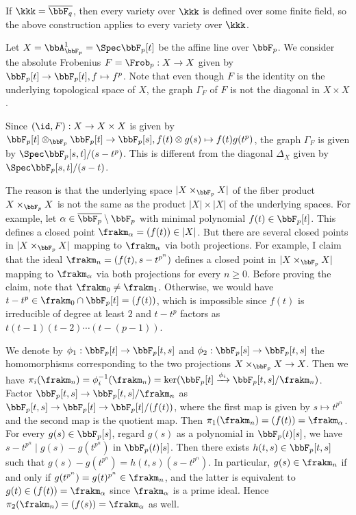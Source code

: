   If $\kkk = \overline{\bbF_q}$, then every variety over $\kkk$ is defined over some finite field, so the above construction applies to every variety over $\kkk$.

  \begin{example}
    Let $X = \bbA^1_{\bbF_p} = \Spec \bbF_p[t]$ be the affine line over $\bbF_p$.
    We consider the absolute Frobenius $F = \Frob_p: X \to X$ given by $\bbF_p[t] \to \bbF_p[t], f \mapsto f^p$.
    Note that even though $F$ is the identity on the underlying topological space of $X$, the graph $\Gamma_F$ of $F$ is not the diagonal in $X \times X$.
    
    Since $(\id,F): X \to X \times X$ is given by $\bbF_p[t] \otimes_{\bbF_p} \bbF_p[t] \to \bbF_p[s], f(t) \otimes g(s) \mapsto f(t) g(t^p)$, the graph $\Gamma_F$ is given by $\Spec \bbF_p[s,t]/(s - t^p)$.
    This is different from the diagonal $\Delta_X$ given by $\Spec \bbF_p[s,t]/(s-t)$.
     
    The reason is that the underlying space $|X \times_{\bbF_p} X|$ of the fiber product $X \times_{\bbF_p} X$ is not the same as the product $|X| \times |X|$ of the underlying spaces.
    For example, let $\alpha \in \overline{\bbF_p} \setminus \bbF_p$ with minimal polynomial $f(t) \in \bbF_p[t]$.
    This defines a closed point $\frakm_\alpha = (f(t)) \in |X|$.
    But there are several closed points in $|X \times_{\bbF_p} X|$ mapping to $\frakm_\alpha$ via both projections.
    For example, I claim that the ideal $\frakm_n = (f(t), s-t^{p^n})$ defines a closed point in $|X \times_{\bbF_p} X|$ mapping to $\frakm_\alpha$ via both projections for every $n \geq 0$.
    Before proving the claim, note that $\frakm_0 \neq \frakm_1$.
    Otherwise, we would have $t-t^p \in \frakm_0 \cap \bbF_p[t] = (f(t))$, which is impossible since $f(t)$ is irreducible of degree at least $2$ and $t-t^p$ factors as $t(t-1)(t-2) \cdots (t-(p-1))$.

    We denote by $\phi_1: \bbF_p[t] \to \bbF_p[t,s]$ and $\phi_2: \bbF_p[s] \to \bbF_p[t,s]$ the homomorphisms corresponding to the two projections $X \times_{\bbF_p} X \to X$.
    Then we have $\pi_i(\frakm_n) = \phi_i^{-1}(\frakm_n) = \ker(\bbF_p[t] \xrightarrow{\phi_i} \bbF_p[t,s]/\frakm_n)$.
    Factor $\bbF_p[t,s] \to \bbF_p[t,s]/\frakm_n$ as $\bbF_p[t,s] \to \bbF_p[t] \to \bbF_p[t]/(f(t))$, where the first map is given by $s \mapsto t^{p^n}$ and the second map is the quotient map.
    Then $\pi_1(\frakm_n) = (f(t)) = \frakm_\alpha$.
    For every $g(s) \in \bbF_p[s]$, regard $g(s)$ as a polynomial in $\bbF_p(t)[s]$, we have $s-t^{p^n} \mid g(s) - g(t^{p^n})$ in $\bbF_p(t)[s]$.
    Then there exists $h(t,s) \in \bbF_p[t,s]$ such that $g(s) - g(t^{p^n}) = h(t,s)(s-t^{p^n})$.
    In particular, $g(s) \in \frakm_n$ if and only if $g(t^{p^n}) = g(t)^{p^n} \in \frakm_n$, and the latter is equivalent to $g(t) \in (f(t)) = \frakm_\alpha$ since $\frakm_\alpha$ is a prime ideal.
    Hence $\pi_2(\frakm_n) = (f(s)) = \frakm_\alpha$ as well.
  \end{example}
  
